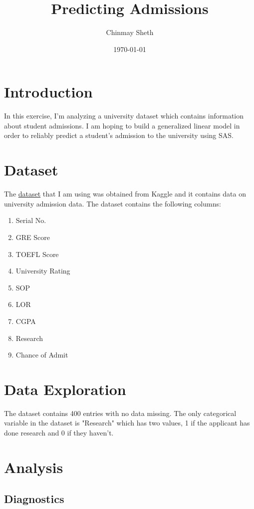 \documentclass{article}
\title{Predicting Admissions}
\author{Chinmay Sheth}
\date\today
\begin{document}
\maketitle

\section*{Introduction}

In this exercise, I'm analyzing a university dataset which contains information about student admissions. I am hoping to build a generalized linear model in order to reliably predict a student's admission to the university using SAS.

\section*{Dataset}

The \href{https://www.kaggle.com/mohansacharya/graduate-admissions}{dataset} that I am using was obtained from Kaggle and it contains data on university admission data. The dataset contains the following columns:

\begin{enumerate}

\item Serial No.
\item GRE Score
\item TOEFL Score
\item University Rating
\item SOP
\item LOR
\item CGPA
\item Research
\item Chance of Admit

\end{enumerate}

\section*{Data Exploration}

The dataset contains 400 entries with no data missing. The only categorical variable in the dataset is "Research" which has two values, 1 if the applicant has done research and 0 if they haven't.

\section*{Analysis}
\subsection*{Diagnostics}
\end{document}
